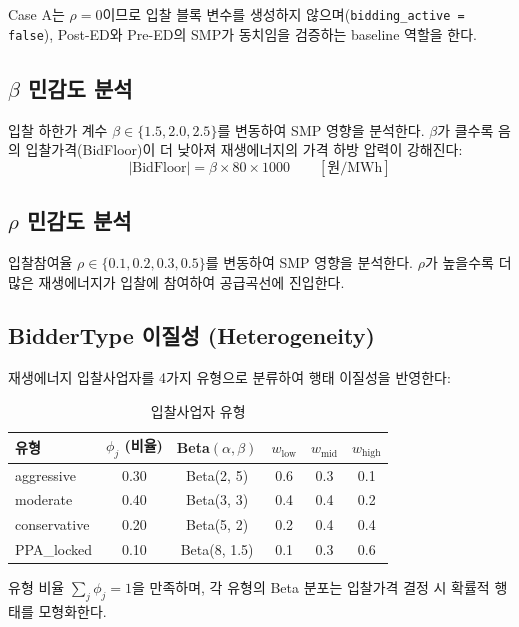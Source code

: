 \documentclass[11pt, a4paper]{article}
\begin{document}
Case A는 $\rho = 0$이므로 입찰 블록 변수를 생성하지 않으며(\texttt{bidding\_active = false}),
Post-ED와 Pre-ED의 SMP가 동치임을 검증하는 baseline 역할을 한다.

\subsection{$\beta$ 민감도 분석}

입찰 하한가 계수 $\beta \in \{1.5, 2.0, 2.5\}$를 변동하여 SMP 영향을 분석한다.
$\beta$가 클수록 음의 입찰가격(BidFloor)이 더 낮아져 재생에너지의 가격 하방 압력이 강해진다:
\begin{equation}
    |\text{BidFloor}| = \beta \times 80 \times 1000 \qquad [\text{원/MWh}]
\end{equation}

\subsection{$\rho$ 민감도 분석}

입찰참여율 $\rho \in \{0.1, 0.2, 0.3, 0.5\}$를 변동하여 SMP 영향을 분석한다.
$\rho$가 높을수록 더 많은 재생에너지가 입찰에 참여하여 공급곡선에 진입한다.

\subsection{BidderType 이질성 (Heterogeneity)}\label{sec:bidder_types}

재생에너지 입찰사업자를 4가지 유형으로 분류하여 행태 이질성을 반영한다:

\begin{table}[H]
\centering
\caption{입찰사업자 유형}\label{tab:bidder_types}
\small
\begin{tabular}{lccccc}
\toprule
\textbf{유형} & $\phi_j$ (비율) & Beta$(\alpha, \beta)$ & $w_{\text{low}}$ & $w_{\text{mid}}$ & $w_{\text{high}}$ \\
\midrule
aggressive   & 0.30 & Beta(2, 5) & 0.6 & 0.3 & 0.1 \\
moderate     & 0.40 & Beta(3, 3) & 0.4 & 0.4 & 0.2 \\
conservative & 0.20 & Beta(5, 2) & 0.2 & 0.4 & 0.4 \\
PPA\_locked  & 0.10 & Beta(8, 1.5) & 0.1 & 0.3 & 0.6 \\
\bottomrule
\end{tabular}
\end{table}

유형 비율 $\sum_j \phi_j = 1$을 만족하며, 각 유형의 Beta 분포는
입찰가격 결정 시 확률적 행태를 모형화한다.
\end{document}
